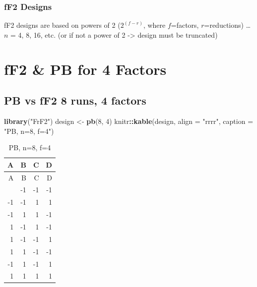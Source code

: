 \documentclass[
  12pt,
  a4paper,
]{article}
\newenvironment{Shaded}{\begin{snugshade}}{\end{snugshade}}
\newcommand{\AttributeTok}[1]{\textcolor[rgb]{0.13,0.29,0.53}{#1}}
\newcommand{\DecValTok}[1]{\textcolor[rgb]{0.00,0.00,0.81}{#1}}
\newcommand{\FunctionTok}[1]{\textcolor[rgb]{0.13,0.29,0.53}{\textbf{#1}}}
\newcommand{\NormalTok}[1]{#1}
\newcommand{\OtherTok}[1]{\textcolor[rgb]{0.56,0.35,0.01}{#1}}
\newcommand{\SpecialCharTok}[1]{\textcolor[rgb]{0.81,0.36,0.00}{\textbf{#1}}}
\newcommand{\StringTok}[1]{\textcolor[rgb]{0.31,0.60,0.02}{#1}}
\numberwithin{equation}{section}
\theoremstyle{plain}
\theoremstyle{definition}
\theoremstyle{remark}
\theoremstyle{note}
\begin{document}
\hypertarget{ff2-designs}{%
\subsubsection{fF2 Designs}\label{ff2-designs}}

fF2 designs are based on powers of 2 (\(2^{(f-r)}\), where
\(f\)=factors, \(r\)=reductions) \ldots{} \(n\) = 4, 8, 16, etc. (or if
not a power of 2 -\textgreater{} design must be truncated)

\newpage

\hypertarget{ff2-pb-for-4-factors}{%
\section{fF2 \& PB for 4 Factors}\label{ff2-pb-for-4-factors}}

\setcounter{table}{0}

\hypertarget{pb-vs-ff2-8-runs-4-factors}{%
\subsection{PB vs fF2 8 runs, 4
factors}\label{pb-vs-ff2-8-runs-4-factors}}

\begin{Shaded}
\begin{Highlighting}[]
\FunctionTok{library}\NormalTok{(}\StringTok{"FrF2"}\NormalTok{)}
\NormalTok{design }\OtherTok{\textless{}{-}} \FunctionTok{pb}\NormalTok{(}\DecValTok{8}\NormalTok{, }\DecValTok{4}\NormalTok{)}
\NormalTok{knitr}\SpecialCharTok{::}\FunctionTok{kable}\NormalTok{(design, }\AttributeTok{align =} \StringTok{"rrrr"}\NormalTok{, }\AttributeTok{caption =} \StringTok{"PB, n=8, f=4"}\NormalTok{)}
\end{Highlighting}
\end{Shaded}

\begin{longtable}[]{@{}rrrr@{}}
\caption{PB, n=8, f=4}\tabularnewline
\toprule\noalign{}
A & B & C & D \\
\midrule\noalign{}
\endfirsthead
\toprule\noalign{}
A & B & C & D \\
\midrule\noalign{}
\endhead
\bottomrule\noalign{}
\endlastfoot
-1 & -1 & -1 & -1 \\
-1 & -1 & 1 & 1 \\
-1 & 1 & 1 & -1 \\
1 & -1 & 1 & -1 \\
1 & -1 & -1 & 1 \\
1 & 1 & -1 & -1 \\
-1 & 1 & -1 & 1 \\
1 & 1 & 1 & 1 \\
\end{longtable}
\end{document}
